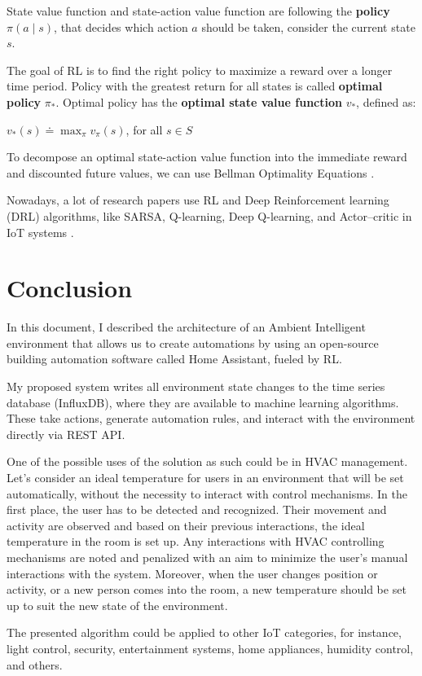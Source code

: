 \documentclass[fleqn,10pt]{olplainarticle}
\begin{document}
State value function and state-action value function are following the \textbf{policy} $\pi(a \mid s)$, that decides which action $a$ should be taken, consider the current state $s$.

\vskip10pt

The goal of RL is to find the right policy to maximize a reward over a longer time period. Policy with the greatest return for all states is called \textbf{optimal policy} $\pi_{*}$. Optimal policy has the \textbf{optimal state value function} $v_{*}$, defined as:
\begin{center}
$v_{*}(s) \doteq \max_{\pi} v_{\pi}(s)$, for all $s \in S$
\end{center}

To decompose an optimal state-action value function into the immediate reward and discounted future values, we can use Bellman Optimality Equations \cite{AZUATALAM2020100020}.

\vskip10pt

Nowadays, a lot of research papers use RL \cite{Deng2021} and Deep Reinforcement learning (DRL) \cite{Brandi2020,McKee2020,Qin2021,Yu2020} algorithms, like SARSA, Q-learning, Deep Q-learning, and Actor–critic in IoT systems \cite{Frikha2021}.


\section{Conclusion}

In this document, I described the architecture of an Ambient Intelligent environment that allows us to create automations by using an open-source building automation software called Home Assistant, fueled by RL.

\vskip10pt

My proposed system writes all environment state changes to the time series database (InfluxDB), where they are available to machine learning algorithms. These take actions, generate automation rules, and interact with the environment directly via REST API.

\vskip10pt

One of the possible uses of the solution as such could be in HVAC management. Let’s consider an ideal temperature for users in an environment that will be set automatically, without the necessity to interact with control mechanisms. In the first place, the user has to be detected and recognized. Their movement and activity are observed and based on their previous interactions, the ideal temperature in the room is set up. Any interactions with HVAC controlling mechanisms are noted and penalized with an aim to minimize the user’s manual interactions with the system. Moreover, when the user changes position or activity, or a new person comes into the room, a new temperature should be set up to suit the new state of the environment.

\vskip10pt

The presented algorithm could be applied to other IoT categories, for instance, light control, security, entertainment systems, home appliances, humidity control, and others.

\vskip10pt\vskip10pt\vskip10pt

\pagebreak


\end{document}
